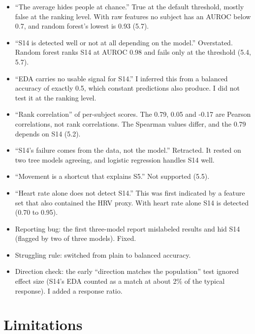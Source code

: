 \documentclass[11pt]{article}
\providecommand{\tightlist}{\setlength{\itemsep}{2pt}\setlength{\parskip}{0pt}}
\begin{document}
\begin{itemize}
\tightlist
\item
  ``The average hides people at chance.'' True at the default threshold,
  mostly false at the ranking level. With raw features no subject has an
  AUROC below 0.7, and random forest's lowest is 0.93 (5.7).
\item
  ``S14 is detected well or not at all depending on the model.''
  Overstated. Random forest ranks S14 at AUROC 0.98 and fails only at
  the threshold (5.4, 5.7).
\item
  ``EDA carries no usable signal for S14.'' I inferred this from a
  balanced accuracy of exactly 0.5, which constant predictions also
  produce. I did not test it at the ranking level.
\item
  ``Rank correlation'' of per-subject scores. The 0.79, 0.05 and -0.17
  are Pearson correlations, not rank correlations. The Spearman values
  differ, and the 0.79 depends on S14 (5.2).
\item
  ``S14's failure comes from the data, not the model.'' Retracted. It
  rested on two tree models agreeing, and logistic regression handles
  S14 well.
\item
  ``Movement is a shortcut that explains S5.'' Not supported (5.5).
\item
  ``Heart rate alone does not detect S14.'' This was first indicated by
  a feature set that also contained the HRV proxy. With heart rate alone
  S14 is detected (0.70 to 0.95).
\item
  Reporting bug: the first three-model report mislabeled results and hid
  S14 (flagged by two of three models). Fixed.
\item
  Struggling rule: switched from plain to balanced accuracy.
\item
  Direction check: the early ``direction matches the population'' test
  ignored effect size (S14's EDA counted as a match at about 2\% of the
  typical response). I added a response ratio.
\end{itemize}

\hypertarget{limitations}{%
\section{Limitations}\label{limitations}}
\end{document}
